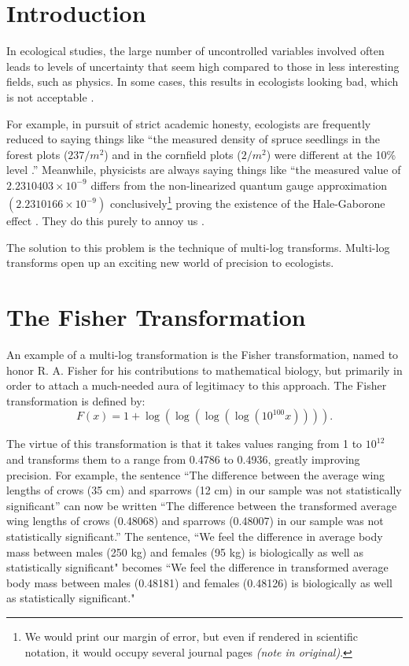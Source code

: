 \section {Introduction}

In ecological studies, the large number of uncontrolled variables involved
often leads to levels of uncertainty that seem high compared to those in
less interesting fields, such as physics.  In some cases, this results in
ecologists looking bad, which is not acceptable \cite{EManifesto}.

For example, in pursuit of strict academic honesty, ecologists are
frequently reduced to saying things like ``the measured density of spruce
seedlings in the forest plots ($237/m^2$) and in the cornfield plots
($2/m^2$) were different at the 10\% level \cite{Eco1}.''  Meanwhile,
physicists are always saying things like ``the measured value of $2.2310403
\times 10^{-9}$ differs from the non-linearized quantum gauge approximation
$(2.2310166 \times 10^{-9})$ conclusively\footnote{We would print our
margin of error, but even if rendered in scientific notation, it would
occupy several journal pages {\em (note in original)}.} proving the
existence of the Hale-Gaborone effect \cite{Phy1}.  They do this purely to
annoy us \cite{PManifesto}.

The solution to this problem is the technique of multi-log transforms.
Multi-log transforms open up an exciting new world of precision to
ecologists.  

\section {The Fisher Transformation}

An example of a multi-log transformation is the Fisher transformation,
named to honor R. A. Fisher for his contributions to mathematical biology,
but primarily in order to attach a much-needed aura of legitimacy to this
approach.  The Fisher transformation is defined by:
$$
	F(x) = 1 + \log(\log(\log(\log(10^{100}x)))).
$$

The virtue of this transformation is that it takes values ranging from 1 to
$10^{12}$ and transforms them to a range from 0.4786 to 0.4936, greatly
improving precision.  For example, the sentence ``The difference between
the average wing lengths of crows (35 cm) and sparrows (12 cm) in our
sample was not statistically significant'' can now be written  ``The
difference between the transformed average wing lengths of crows (0.48068)
and sparrows (0.48007) in our sample was not statistically significant.''
The sentence, ``We feel the difference in average body mass between males
(250 kg) and females (95 kg) is biologically as well as statistically
significant" becomes ``We feel the difference in transformed average body
mass between males (0.48181) and females (0.48126) is biologically as well
as statistically significant."

